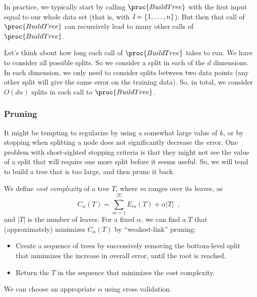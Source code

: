 In practice, we typically start by calling $\proc{BuildTree}$ with the first
input equal to our
whole data set (that is, with ${\emph I} = \{1,\ldots,n\}$). But then that
call of $\proc{BuildTree}$ can recursively lead to many other calls
of $\proc{BuildTree}$.

Let's think about how long each call of $\proc{BuildTree}$ takes to
run. We have to consider all possible splits. So we consider a split
in each of the $d$ dimensions. In each dimension, we only need to
consider splits between two data points (any other split will give the
same error on the training data). So, in total, we consider $O(d n)$
splits in each call to $\proc{BuildTree}$.

\subsubsection{Pruning}
It might be tempting to regularize by using a somewhat large
value of $k$, or by stopping when splitting a node does not significantly
decrease the error.  One problem with short-sighted stopping criteria
is that they might not see the value of a split that will require one
more split before it seems useful.
So, we will tend to build a tree that is too large, and then prune it
back.

We define {\em cost complexity} of a
tree $T$, where $m$ ranges over its leaves, as
\begin{equation}
  C_\alpha(T) = \sum_{m = 1}^{|T|} E_m(T) + \alpha |T|\;\;,
\end{equation}
and $|T|$ is the number of leaves.
For a fixed $\alpha$, we can find a $T$ that (approximately) minimizes
$C_\alpha(T)$ by ``weakest-link'' pruning:
\begin{itemize}
  \item Create a sequence of trees by successively removing the
        bottom-level split that minimizes the increase in overall error,
        until the root is reached.
  \item Return the $T$ in the sequence that minimizes the cost complexity.
\end{itemize}
We can choose an appropriate $\alpha$ using cross validation.

